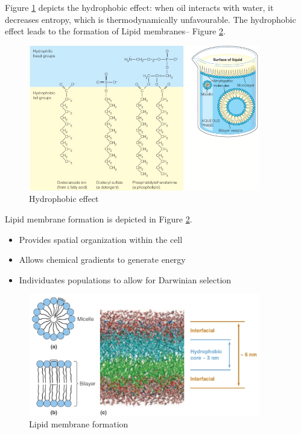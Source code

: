 \documentclass[]{article}
\begin{document}
Figure \ref{fig:HydrophobicEffect} depicts the hydrophobic effect: when oil interacts with water, it decreases entropy, which is thermodynamically unfavourable.
The hydrophobic effect leads to the formation of Lipid membranes-- Figure \ref{fig:LiquidMembraneFormation}. 
\begin{figure}[H]
	\caption{Hydrophobic effect} \label{fig:HydrophobicEffect} 
	\includegraphics[width=0.9\textwidth]{HydrophobicEffect}
\end{figure}

Lipid membrane formation is depicted in Figure \ref{fig:LiquidMembraneFormation}.

\begin{itemize}
	\item Provides spatial organization within the cell
	\item Allows chemical gradients to generate energy
	\item Individuates populations to allow for Darwinian selection
\end{itemize}

\begin{figure}[H]
	\caption{Lipid membrane formation} \label{fig:LiquidMembraneFormation} 
	\includegraphics[width=0.9\textwidth]{LiquidMembraneFormation}
\end{figure}
\end{document}
